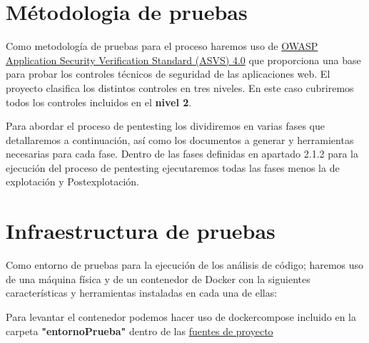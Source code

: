 
\section{Métodologia de pruebas} 

Como metodología de pruebas para el proceso haremos uso 
de \href{https://owasp.org/www-pdf-archive/OWASP_Application_Security_Verification_Standard_4.0-en.pdf}{OWASP Application Security Verification Standard (ASVS) 4.0} 
que proporciona una base para probar los controles técnicos de seguridad de las aplicaciones web. El proyecto clasifica
 los distintos controles en tres niveles. En este caso cubriremos todos los controles incluidos en el \textbf{nivel 2}.

Para abordar el proceso de pentesting los dividiremos en varias fases que detallaremos a continuación, así como los documentos a generar y herramientas necesarias para cada fase.
Dentro de las fases definidas en apartado 2.1.2 para la ejecución del proceso de pentesting ejecutaremos todas las fases menos la de explotación y Postexplotación.

\section{Infraestructura de pruebas} 
Como entorno de pruebas para la ejecución de los análisis de código; haremos uso de una máquina física y de un contenedor 
de Docker con la siguientes características y herramientas instaladas en cada una de ellas:

Para levantar el contenedor podemos hacer uso de dockercompose incluido en la carpeta \textbf{"entornoPrueba"} dentro de 
las \href{https://github.com/M0l1n3ta/PFG/tree/master}{fuentes de proyecto}